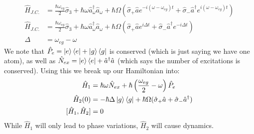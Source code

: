 \begin{align*}
	\hat{H}_{J.C.} &= \frac{\hbar\omega_{eg}}{2} \hat{\sigma}_3 + \hbar\omega\hat{a}_\omega^\dagger\hat{a}_\omega + \hbar\Omega\left(\hat{\sigma}_+\hat{a} e^{-i(\omega - \omega_{eg})t} + \hat{\sigma}_-\hat{a}^\dagger e^{i(\omega - \omega_{eg})t}\right) \\
	\hat{H}_{J.C.} &= \frac{\hbar\omega_{eg}}{2} \hat{\sigma}_3 + \hbar\omega\hat{a}_\omega^\dagger\hat{a}_\omega + \hbar\Omega\left(\hat{\sigma}_+\hat{a} e^{i\Delta t} + \hat{\sigma}_-\hat{a}^\dagger e^{-i\Delta t}\right) \\
	\Delta &= \omega_{eg} - \omega
\end{align*}
We note that $\hat{P}_e = \ket{e}\bra{e} + \ket{g}\bra{g}$ is conserved (which is just saying we have one atom), as well as $\hat{N}_{ex} = \ket{e}\bra{e} + \hat{a}^\dagger \hat{a}$ (which says the number of excitations is conserved).
Using this we break up our Hamiltonian into:
\begin{align*}
	\hat{H}_1 &= \hbar\omega\hat{N}_{ex} + \hbar\left(\frac{\omega_{eg}}{2} - \omega\right)\hat{P}_e \\
	\hat{H}_2(0) &= -\hbar\Delta\ket{g}\bra{g} + \hbar\Omega(\hat{\sigma}_+\hat{a} + \hat{\sigma}_-\hat{a}^\dagger) \\
	[\hat{H}_1,\hat{H}_2] &= 0
\end{align*}
While $\hat{H}_1$ will only lead to phase variations, $\hat{H}_2$ will cause dynamics.

